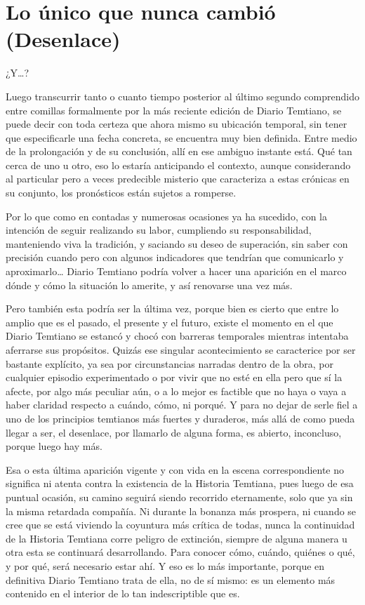 \documentclass[
]{book}
\begin{document}
\hypertarget{lo-uxfanico-que-nunca-cambiuxf3-desenlace}{%
\chapter{Lo único que nunca cambió (Desenlace)}\label{lo-uxfanico-que-nunca-cambiuxf3-desenlace}}

¿Y\ldots?

Luego transcurrir tanto o cuanto tiempo posterior al último segundo comprendido entre comillas formalmente por la más reciente edición de Diario Temtiano, se puede decir con toda certeza que ahora mismo su ubicación temporal, sin tener que especificarle una fecha concreta, se encuentra muy bien definida. Entre medio de la prolongación y de su conclusión, allí en ese ambiguo instante está. Qué tan cerca de uno u otro, eso lo estaría anticipando el contexto, aunque considerando al particular pero a veces predecible misterio que caracteriza a estas crónicas en su conjunto, los pronósticos están sujetos a romperse.

Por lo que como en contadas y numerosas ocasiones ya ha sucedido, con la intención de seguir realizando su labor, cumpliendo su responsabilidad, manteniendo viva la tradición, y saciando su deseo de superación, sin saber con precisión cuando pero con algunos indicadores que tendrían que comunicarlo y aproximarlo\ldots{} Diario Temtiano podría volver a hacer una aparición en el marco dónde y cómo la situación lo amerite, y así renovarse una vez más.

Pero también esta podría ser la última vez, porque bien es cierto que entre lo amplio que es el pasado, el presente y el futuro, existe el momento en el que Diario Temtiano se estancó y chocó con barreras temporales mientras intentaba aferrarse sus propósitos. Quizás ese singular acontecimiento se caracterice por ser bastante explícito, ya sea por circunstancias narradas dentro de la obra, por cualquier episodio experimentado o por vivir que no esté en ella pero que sí la afecte, por algo más peculiar aún, o a lo mejor es factible que no haya o vaya a haber claridad respecto a cuándo, cómo, ni porqué. Y para no dejar de serle fiel a uno de los principios temtianos más fuertes y duraderos, más allá de como pueda llegar a ser, el desenlace, por llamarlo de alguna forma, es abierto, inconcluso, porque luego hay más.

Esa o esta última aparición vigente y con vida en la escena correspondiente no significa ni atenta contra la existencia de la Historia Temtiana, pues luego de esa puntual ocasión, su camino seguirá siendo recorrido eternamente, solo que ya sin la misma retardada compañía. Ni durante la bonanza más prospera, ni cuando se cree que se está viviendo la coyuntura más crítica de todas, nunca la continuidad de la Historia Temtiana corre peligro de extinción, siempre de alguna manera u otra esta se continuará desarrollando. Para conocer cómo, cuándo, quiénes o qué, y por qué, será necesario estar ahí. Y eso es lo más importante, porque en definitiva Diario Temtiano trata de ella, no de sí mismo: es un elemento más contenido en el interior de lo tan indescriptible que es.
\end{document}
